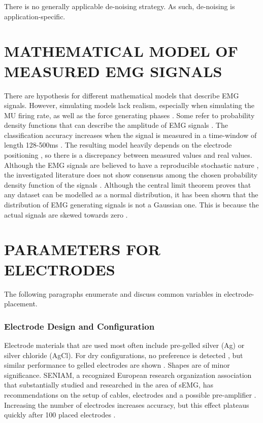 \documentclass{article}
\begin{document}
There is no generally applicable de-noising strategy. As such, de-noising is application-specific.

\section{MATHEMATICAL MODEL OF MEASURED EMG SIGNALS}
There are hypothesis for different mathematical models that describe EMG signals. However, simulating models lack realism, especially when simulating the MU firing rate, as well as the force generating phases \cite{AlHarrach2017}. Some refer to probability density functions that can describe the amplitude of EMG signals \cite{Thongpanja2015} \cite{Nazarpour2013}. The classification accuracy increases when the signal is measured in a time-window of length 128-500ms \cite{Farina2000}\cite{Thongpanja2015} \cite{Matsubara2013}. The resulting model heavily depends on the electrode positioning \cite{Nazmi2016}, so there is a discrepancy between measured values and real values. Although the EMG signals are believed to have a reproducible \cite{Du2017} stochastic nature \cite{Rogers2013} \cite{Thongpanja2013} \cite{Clancy1999}, the investigated literature does not show consensus among the chosen probability density function of the signals \cite{Nazmi2016}. Although the central limit theorem proves that any dataset can be modelled as a normal distribution, it has been shown that the distribution of EMG generating signals is not a Gaussian one. This is because the actual signals are skewed towards zero \cite{Hunter1987} \cite{Bilodeau1997}.

\section{PARAMETERS FOR ELECTRODES \cite{Kilby2016}}
The following paragraphs enumerate and discuss common variables in electrode-placement.

\subsubsection{Electrode Design and Configuration} Electrode materials that are used most often include pre-gelled silver (Ag) or silver chloride (AgCl). For dry configurations, no preference is detected \cite{Kilby2016}, but similar performance to gelled electrodes are shown \cite{McIntosh2016}. Shapes are of minor significance. SENIAM, a recognized European research organization association that substantially studied and researched in the area of sEMG, has recommendations on the setup of cables, electrodes and a possible pre-amplifier \cite{Kilby2016}. Increasing the number of electrodes increases accuracy, but this effect plateaus quickly after 100 placed electrodes \cite{Amma2015}.
\end{document}
